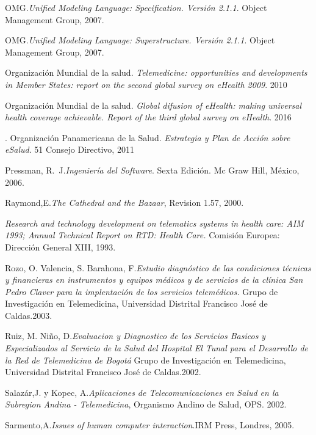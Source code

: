 \begin{thebibliography}{}
 OMG.\textit{Unified Modeling Language: Specification. Versión 2.1.1}. Object Management Group, 2007.

 OMG.\textit{Unified Modeling Language: Superstructure. Versión 2.1.1}. Object Management Group, 2007.

 Organización Mundial de la salud. \textit{Telemedicine: opportunities and developments in Member States: report on the second global survey on eHealth 2009}. 2010

 Organización Mundial de la salud. \textit{Global difusion of eHealth: making universal health coverage achievable. Report of the third global survey on eHealth}. 2016

. Organización Panamericana de la Salud. \textit{Estrategia y Plan de Acción sobre eSalud}. 51 Consejo Directivo, 2011

 Pressman, R.~J.\textit{Ingeniería del Software}. Sexta Edición. Mc Graw 
Hill, México, 2006.

 Raymond,E.\textit{The Cathedral and the Bazaar}, Revision 1.57, 2000.

 \textit{Research and technology development on telematics systems in health care: AIM 1993; Annual Technical Report on RTD: Health Care.} Comisión Europea: Dirección General XIII, 1993.

 Rozo, O. Valencia, S. Barahona, F.\textit{Estudio diagnóstico de las condiciones técnicas y financieras en instrumentos y equipos médicos  y de servicios de la clínica San Pedro Claver para la implentación de los servicios telemédicos.} Grupo de Investigación en Telemedicina,  Universidad Distrital Francisco José de Caldas.2003.

 Ruiz, M. Niño, D.\textit{Evaluacion y Diagnostico de los Servicios Basicos y Especializados al Servicio de la Salud del Hospital El Tunal para el Desarrollo de la Red de Telemedicina de Bogotá} Grupo de Investigación en Telemedicina,  Universidad Distrital Francisco José de Caldas.2002.

 Salazár,J. y Kopec, A.\textit{Aplicaciones de Telecomunicaciones en Salud en la Subregion Andina - Telemedicina}, Organismo Andino de Salud, OPS. 2002.

 Sarmento,A.\textit{Issues of human computer interaction}.IRM Press, Londres, 2005. 


\end{thebibliography}
